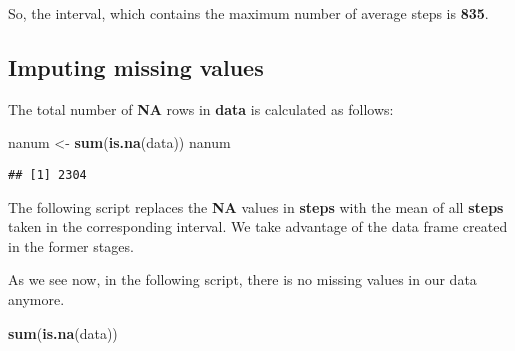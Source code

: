 \documentclass[]{article}
\newenvironment{Shaded}{\begin{snugshade}}{\end{snugshade}}
\newcommand{\KeywordTok}[1]{\textcolor[rgb]{0.13,0.29,0.53}{\textbf{#1}}}
\newcommand{\DecValTok}[1]{\textcolor[rgb]{0.00,0.00,0.81}{#1}}
\newcommand{\StringTok}[1]{\textcolor[rgb]{0.31,0.60,0.02}{#1}}
\newcommand{\ControlFlowTok}[1]{\textcolor[rgb]{0.13,0.29,0.53}{\textbf{#1}}}
\newcommand{\OperatorTok}[1]{\textcolor[rgb]{0.81,0.36,0.00}{\textbf{#1}}}
\newcommand{\NormalTok}[1]{#1}
\begin{document}
So, the interval, which contains the maximum number of average steps is
\textbf{835}.

\subsection{Imputing missing values}\label{imputing-missing-values}

The total number of \textbf{NA} rows in \textbf{data} is calculated as
follows:

\begin{Shaded}
\begin{Highlighting}[]
\NormalTok{nanum <-}\StringTok{ }\KeywordTok{sum}\NormalTok{(}\KeywordTok{is.na}\NormalTok{(data))}
\NormalTok{nanum}
\end{Highlighting}
\end{Shaded}

\begin{verbatim}
## [1] 2304
\end{verbatim}

The following script replaces the \textbf{NA} values in \textbf{steps}
with the mean of all \textbf{steps} taken in the corresponding interval.
We take advantage of the data frame created in the former stages.

\begin{Shaded}
\end{Shaded}

As we see now, in the following script, there is no missing values in
our data anymore.

\begin{Shaded}
\begin{Highlighting}[]
\KeywordTok{sum}\NormalTok{(}\KeywordTok{is.na}\NormalTok{(data))}
\end{Highlighting}
\end{Shaded}
\end{document}
